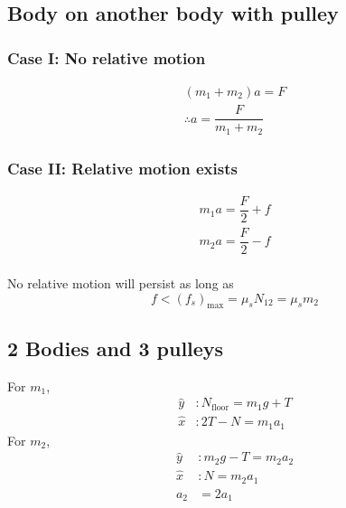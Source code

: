 \documentclass[fleqn]{article}
\begin{document}
\subsection{Body on another body with pulley}

\subsubsection{Case I: No relative motion}

\begin{align*}
	(m_1 + m_2)a = F\\
	\therefore a = \dfrac{F}{m_1 + m_2}
\end{align*}

\subsubsection{Case II: Relative motion exists}

\begin{align*}
	m_1 a = \dfrac{F}{2} + f \\
	m_2 a = \dfrac{F}{2} - f \\
\end{align*}

No relative motion will persist as long as 
\begin{equation*}
	f < (f_s)_{\text{max}} = \mu_s N_{12} = \mu_s m_2	
\end{equation*}

\subsection{2 Bodies and 3 pulleys}

For $m_1$,
\begin{align*}
	\hat{y} &: N_{\text{floor}} = m_1 g + T\\
	\hat{x} &: 2T - N = m_1 a_1
\end{align*}
For $m_2$,
\begin{align}
	\hat{y} &: m_2 g - T = m_2 a_2\\
	\hat{x} &: N = m_2 a_1\\
	a_2 &= 2 a_1
\end{align}

\subsection{}

\\
\end{document}
